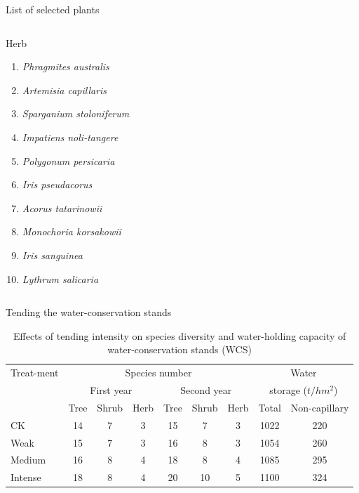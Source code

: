 \begin{frame}{List of selected plants}
\begin{columns}[T,onlytextwidth]
	\begin{exampleblock}{Herb}		
		\begin{enumerate}			
			\item \emph{Phragmites australis} \item \emph{Artemisia capillaris} \item \emph{Sparganium stoloniferum}
			\item \emph{Impatiens noli-tangere} \item \emph{Polygonum persicaria} \item \emph{Iris pseudacorus}
			\item \emph{Acorus tatarinowii} \item \emph{Monochoria korsakowii} \item \emph{Iris sanguinea}
			\item \emph{Lythrum salicaria}
		\end{enumerate}	
	\end{exampleblock}	
\end{columns}
\end{frame}


\begin{frame}{Tending the water-conservation stands}
\begin{table}
	\caption{Effects of tending intensity on species diversity and water-holding capacity of water-conservation stands (WCS)}
	\begin{tabular}{@{}l@{}|@{}cccccc@{}|@{}cc@{}}
		\toprule
		\multirow[c]{3}{4ex}{Treat-ment} & \multicolumn{6}{c}{Species number} & \multicolumn{2}{|c}{Water}\\
		&\multicolumn{3}{c}{First year} & \multicolumn{3}{c}{Second year}& \multicolumn{2}{|c}{storage ($t/hm^2$)}\\
		&  Tree &\textcolor{colshrub}{Shrub} &\textcolor{colherb}{Herb}&Tree&\textcolor{colshrub}{Shrub}&\textcolor{colherb}{Herb}&Total& Non-capillary\\
		\midrule
		CK&14&7&3&15&7&3&1022&220\\
		Weak&15&7&3&16&8&3&1054&260\\
		Medium&16&8&4&18&8&4&1085&295\\
		Intense&18&8&4&20&10&5&1100&324\\
		\bottomrule
	\end{tabular}
\end{table}
\end{frame}

